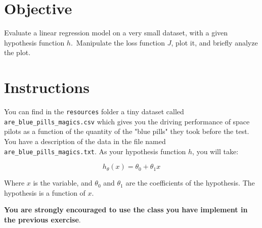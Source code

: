 \documentclass{42-en}
\begin{document}
\section*{Objective}
Evaluate a linear regression model on a very small dataset, with a given hypothesis function $h$.\
Manipulate the loss function $J$, plot it, and briefly analyze the plot.

\section*{Instructions}
You can find in the \texttt{resources} folder a tiny dataset called \texttt{are\_blue\_pills\_magics.csv} which gives you the driving performance of space pilots as a function of the quantity of the "blue pills" they took before the test.
You have a description of the data in the file named \texttt{are\_blue\_pills\_magics.txt}.
As your hypothesis function $h$, you will take:

$$
h_{\theta}(x) = \theta_0 + \theta_1x
$$

Where $x$ is the variable, and $\theta_0$ and $\theta_1$ are the coefficients of the hypothesis.
The hypothesis is a function of $x$.

\textbf{You are strongly encouraged to use the class you have implement in the previous exercise}.
\newline
\end{document}
